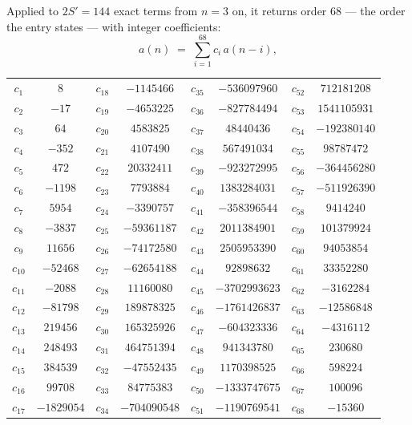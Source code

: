 \documentclass[11pt,a4paper]{article}
\theoremstyle{plain}
\theoremstyle{definition}
\begin{document}
Applied to $2S'=144$ exact terms from $n=3$ on, it returns order $68$ --- the
order the entry states --- with integer coefficients:
\[
a(n)\;=\;\sum_{i=1}^{68}c_i\,a(n-i),
\]
\begin{center}\small
\begin{tabular}{cccccccc}
$c_{1}$ & $8$ & $c_{18}$ & $-1145466$ & $c_{35}$ & $-536097960$ & $c_{52}$ & $712181208$ \\
$c_{2}$ & $-17$ & $c_{19}$ & $-4653225$ & $c_{36}$ & $-827784494$ & $c_{53}$ & $1541105931$ \\
$c_{3}$ & $64$ & $c_{20}$ & $4583825$ & $c_{37}$ & $48440436$ & $c_{54}$ & $-192380140$ \\
$c_{4}$ & $-352$ & $c_{21}$ & $4107490$ & $c_{38}$ & $567491034$ & $c_{55}$ & $98787472$ \\
$c_{5}$ & $472$ & $c_{22}$ & $20332411$ & $c_{39}$ & $-923272995$ & $c_{56}$ & $-364456280$ \\
$c_{6}$ & $-1198$ & $c_{23}$ & $7793884$ & $c_{40}$ & $1383284031$ & $c_{57}$ & $-511926390$ \\
$c_{7}$ & $5954$ & $c_{24}$ & $-3390757$ & $c_{41}$ & $-358396544$ & $c_{58}$ & $9414240$ \\
$c_{8}$ & $-3837$ & $c_{25}$ & $-59361187$ & $c_{42}$ & $2011384901$ & $c_{59}$ & $101379924$ \\
$c_{9}$ & $11656$ & $c_{26}$ & $-74172580$ & $c_{43}$ & $2505953390$ & $c_{60}$ & $94053854$ \\
$c_{10}$ & $-52468$ & $c_{27}$ & $-62654188$ & $c_{44}$ & $92898632$ & $c_{61}$ & $33352280$ \\
$c_{11}$ & $-2088$ & $c_{28}$ & $11160080$ & $c_{45}$ & $-3702993623$ & $c_{62}$ & $-3162284$ \\
$c_{12}$ & $-81798$ & $c_{29}$ & $189878325$ & $c_{46}$ & $-1761426837$ & $c_{63}$ & $-12586848$ \\
$c_{13}$ & $219456$ & $c_{30}$ & $165325926$ & $c_{47}$ & $-604323336$ & $c_{64}$ & $-4316112$ \\
$c_{14}$ & $248493$ & $c_{31}$ & $464751394$ & $c_{48}$ & $941343780$ & $c_{65}$ & $230680$ \\
$c_{15}$ & $384539$ & $c_{32}$ & $-47552435$ & $c_{49}$ & $1170398525$ & $c_{66}$ & $598224$ \\
$c_{16}$ & $99708$ & $c_{33}$ & $84775383$ & $c_{50}$ & $-1333747675$ & $c_{67}$ & $100096$ \\
$c_{17}$ & $-1829054$ & $c_{34}$ & $-704090548$ & $c_{51}$ & $-1190769541$ & $c_{68}$ & $-15360$ \\
\end{tabular}
\end{center}
\end{document}
